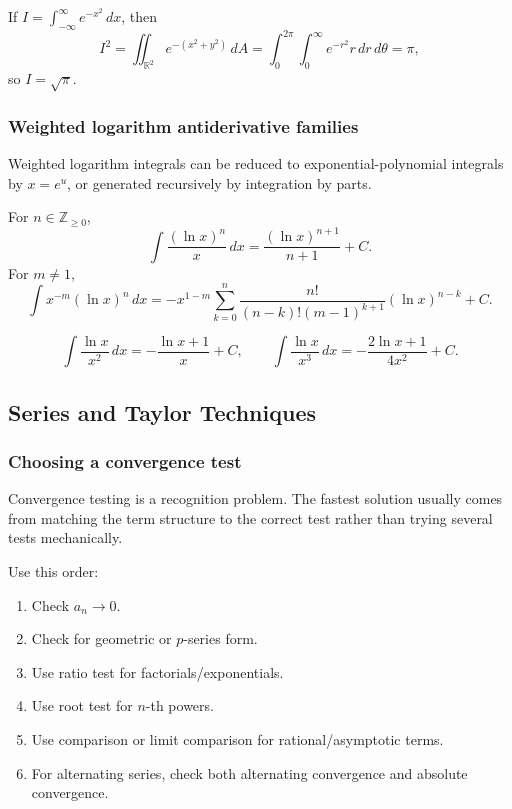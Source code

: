 \begin{examplebox}[title={Square Trick}]
If \(I=\int_{-\infty}^{\infty}e^{-x^2}\,dx\), then
\[
I^2=\iint_{\mathbb R^2}e^{-(x^2+y^2)}\,dA
=\int_0^{2\pi}\int_0^\infty e^{-r^2}r\,dr\,d\theta
=\pi,
\]
so \(I=\sqrt\pi\).
\end{examplebox}

\newpage
\subsubsection{Weighted logarithm antiderivative families}
\begin{extension}
Weighted logarithm integrals can be reduced to exponential-polynomial integrals
by \(x=e^u\), or generated recursively by integration by parts.
\end{extension}

\begin{keyformula}[title={Weighted Logarithm Family}]
For \(n\in\mathbb Z_{\ge0}\),
\[
\int\frac{(\ln x)^n}{x}\,dx=\frac{(\ln x)^{n+1}}{n+1}+C.
\]
For \(m\ne1\),
\[
\int x^{-m}(\ln x)^n\,dx
=-x^{1-m}\sum_{k=0}^{n}
\frac{n!}{(n-k)!(m-1)^{k+1}}(\ln x)^{n-k}+C.
\]
\end{keyformula}

\begin{examplebox}[title={First Logarithmic Cases}]
\[
\int\frac{\ln x}{x^2}\,dx=-\frac{\ln x+1}{x}+C,
\qquad
\int\frac{\ln x}{x^3}\,dx=-\frac{2\ln x+1}{4x^2}+C.
\]
\end{examplebox}

\newpage
\subsection{Series and Taylor Techniques}

\subsubsection{Choosing a convergence test}
\begin{extension}
Convergence testing is a recognition problem.  The fastest solution usually
comes from matching the term structure to the correct test rather than trying
several tests mechanically.
\end{extension}

\begin{examtip}
Use this order:
\begin{enumerate}[leftmargin=*]
\item Check \(a_n\to0\).
\item Check for geometric or \(p\)-series form.
\item Use ratio test for factorials/exponentials.
\item Use root test for \(n\)-th powers.
\item Use comparison or limit comparison for rational/asymptotic terms.
\item For alternating series, check both alternating convergence and absolute convergence.
\end{enumerate}
\end{examtip}

